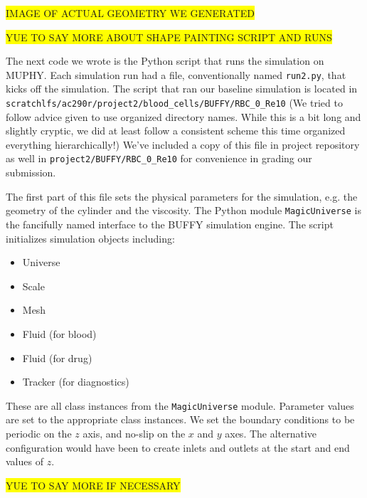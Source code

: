 \documentclass[11pt]{article} %
\newcommand{\tty}[1]{\texttt{#1}}
\begin{document}
\colorbox{yellow}{IMAGE OF ACTUAL GEOMETRY WE GENERATED}

\colorbox{yellow}{YUE TO SAY MORE ABOUT SHAPE PAINTING SCRIPT AND RUNS}

The next code we wrote is the Python script that runs the simulation on MUPHY.
Each simulation run had a file, conventionally named \tty{run2.py}, that kicks off the simulation.  
The script that ran our baseline simulation is located in 
\tty{scratchlfs/ac290r/project2/blood\_cells/BUFFY/RBC\_0\_Re10}
(We tried to follow advice given to use organized directory names.
While this is a bit long and slightly cryptic, we did at least follow a consistent scheme
this time organized everything hierarchically!)
We've included a copy of this file in project repository as well in
\tty{project2/BUFFY/RBC\_0\_Re10} for convenience in grading our submission.

The first part of this file sets the physical parameters for the simulation,
e.g. the geometry of the cylinder and the viscosity.
The Python module \tty{MagicUniverse} is the fancifully named interface to the BUFFY simulation engine.
The script initializes simulation objects including:
\begin{itemize}
\item Universe
\item Scale
\item Mesh
\item Fluid (for blood)
\item Fluid (for drug)
\item Tracker (for diagnostics)
\end{itemize}
These are all class instances from the \tty{MagicUniverse} module.
Parameter values are set to the appropriate class instances.
We set the boundary conditions to be periodic on the $z$ axis,
and no-slip on the $x$ and $y$ axes.
The alternative configuration would have been to create inlets and outlets
at the start and end values of $z$.

\colorbox{yellow}{YUE TO SAY MORE IF NECESSARY}
\end{document}

